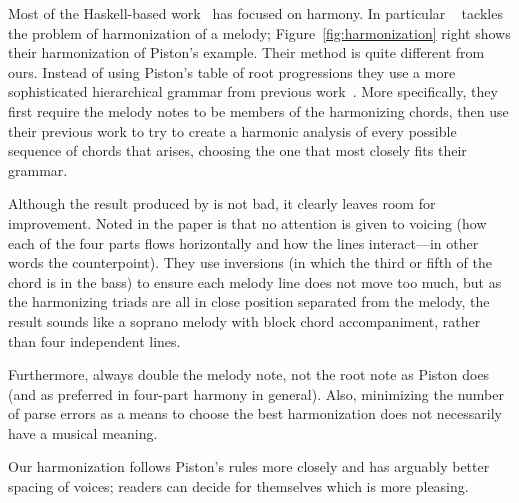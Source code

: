 Most of the Haskell-based
work~\citep{magalhaes-harmtrace,koops-fharm,magalhaes-fcomp} has
focused on harmony. In particular \fharm~\citep{koops-fharm} tackles
the problem of harmonization of a melody;
Figure~\ref{fig:harmonization} right shows their harmonization of
Piston's example. Their method is quite different from
ours. Instead of using Piston's table of root progressions they use a
more sophisticated hierarchical grammar from previous
work~\citep{magalhaes-harmtrace}.
More specifically, they first require the melody notes to be members of
the harmonizing chords, then use their previous work to try to create
a harmonic analysis of every possible sequence of chords that arises,
choosing the one that most closely fits their grammar.

Although the result produced by \fharm is not bad, it clearly leaves
room for improvement. Noted in
the paper is that no attention is given to voicing (how each of the
four parts flows horizontally and how the lines interact---in other
words the counterpoint). They use inversions (in which the
third or fifth of the chord is in the bass) to ensure each melody line
does not move too much, but as the harmonizing triads are all in close
position separated from the melody, the result sounds like a soprano
melody with block chord accompaniment, rather than four independent
lines.

Furthermore, \fharm always double the melody note, not the root note
as Piston does (and as preferred in four-part harmony in general).
Also, minimizing the number of parse errors as a means
to choose the best harmonization does not necessarily have a musical
meaning.

Our harmonization follows Piston's rules more closely and has arguably
better spacing of voices; readers can decide for themselves which is
more pleasing.
